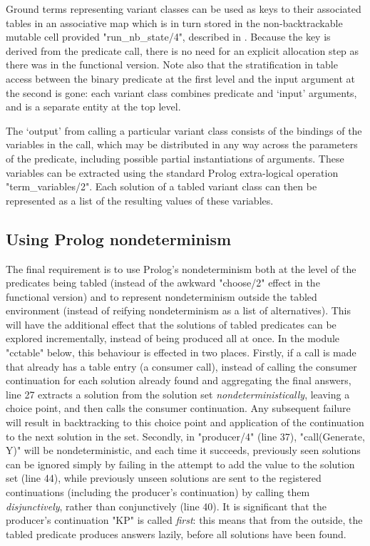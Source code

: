 Ground terms representing variant classes can be
used as keys to their associated tables in an associative map which is in turn stored in
the non-backtrackable mutable cell provided "run_nb_state/4", described in .
Because the key is derived from the predicate call, there is no need
for an explicit allocation step as there was in the functional version. Note also that the
stratification in table access between the binary predicate at the first level
and the input argument at the second is gone: each variant class combines predicate
and `input' arguments, and is a separate entity at the top level.

The `output' from calling a particular variant class consists of
the bindings of the variables in the call, which may be distributed in any
way across the parameters of the predicate, including possible partial instantiations
of arguments. These variables can be extracted using the standard Prolog extra-logical
operation "term_variables/2". Each solution of a tabled variant class can then be represented
as a list of the resulting values of these variables.

\subsection{Using Prolog nondeterminism}

The final requirement is to use Prolog's nondeterminism both at the level of the predicates
being tabled (instead of the awkward "choose/2" effect in the functional version)
and to represent nondeterminism outside the tabled environment (instead of reifying nondeterminism
as a list of alternatives). This will have the additional effect that the solutions of tabled
predicates can be explored incrementally, instead of being produced all at once.
In the module "cctable" below, this behaviour is effected in two places. Firstly, if a call is made
that already has a table entry (\ie a consumer call), instead of calling the consumer continuation
for each solution already found and aggregating the final answers, line 27 extracts a solution
from the solution set \emph{nondeterministically}, leaving a choice point, and then calls
the consumer continuation. Any subsequent failure will result in backtracking to this choice
point and application of the continuation to the next solution in the set.
Secondly, in "producer/4" (line 37), "call(Generate, Y)" will be nondeterministic, and each time it succeeds,
previously seen solutions can be ignored simply by failing in the attempt to add the value to the 
solution set (line 44),
while previously unseen solutions are sent to the registered continuations (including the producer's
continuation) by calling them \emph{disjunctively}, rather than conjunctively (line 40). It is significant that
the producer's continuation "KP" is called \emph{first}: this means that from the outside,
the tabled predicate produces answers lazily, before all solutions have been found.

